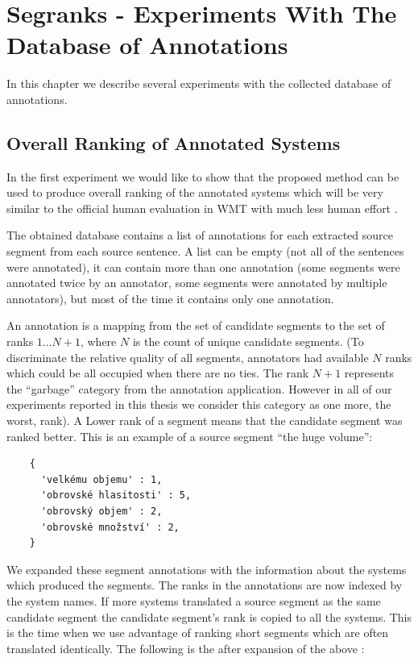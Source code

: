 \chapter{Segranks - Experiments With The Database of Annotations}

In this chapter we describe several experiments with the collected database of
annotations. 

\section{Overall Ranking of Annotated Systems}
\label{evaluating-annotated-systems}

In the first experiment we would like to show that the proposed method can be
used to produce overall ranking of the annotated systems which will be very
similar to the official human evaluation in WMT with much less human effort
.

The obtained database contains a list of annotations for each extracted source
segment from each source sentence. A list can be empty (not all of the
sentences were annotated), it can contain more than one annotation (some
segments were annotated twice by an annotator, some segments were annotated by
multiple annotators), but most of the time it contains only one annotation.

An annotation is a mapping from the set of candidate segments to the set of
ranks ${1 \ldots N+1}$, where $N$ is the count of unique candidate segments.
(To discriminate the relative quality of all segments, annotators had available
$N$ ranks which could be all occupied when there are no ties. The rank $N+1$
represents the ``garbage'' category from the annotation application. However in
all of our experiments reported in this thesis we consider this category as one
more, the worst, rank). A Lower rank of a segment means that the candidate
segment was ranked better. This is an example  of a
source segment ``the huge volume'':

\begin{verbatim}
    {
      'velkému objemu' : 1,
      'obrovské hlasitosti' : 5,
      'obrovský objem' : 2,
      'obrovské množství' : 2,
    }
\end{verbatim}

We expanded these segment annotations with the information about the systems
which produced the segments. The ranks in the annotations are now indexed by
the system names.  If more systems translated a source segment as the same
candidate segment the candidate segment's rank is copied to all the systems.
This is the time when we use advantage of ranking short segments which are
often translated identically.  The following is the 
after expansion of the above :

